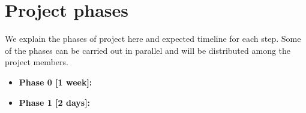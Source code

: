 \section{Project phases}\label{sec:plan}

We explain the phases of project here and expected timeline for 
each step. Some of the phases can be carried out in parallel and will be distributed 
among the project members.

\begin{itemize}
\item \textbf{Phase 0 [1 week]:} 
\item \textbf{Phase 1 [2 days]:} 
\end{itemize}




